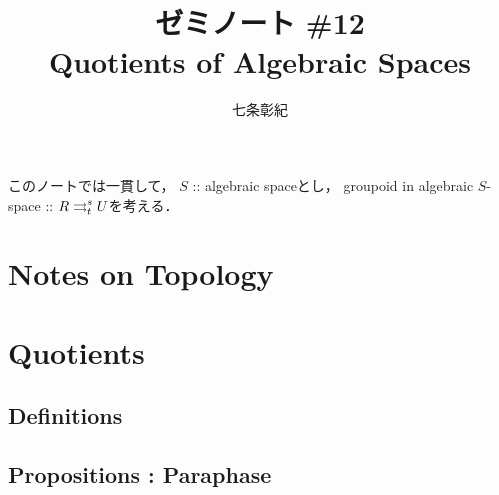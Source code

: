 \documentclass[a4paper, dvipdfmx]{jsarticle}
\begin{document}
\title{ゼミノート \#12 \\ Quotients of Algebraic Spaces}
\author{七条彰紀}
\maketitle
\tableofcontents
\vspace{10pt}

このノートでは一貫して，
$S$ :: algebraic spaceとし，
groupoid in algebraic $S$-space :: $R \mathrel{\mathop{\rightrightarrows}^{s}_{t}} U$を考える．

\section{Notes on Topology}

\section{Quotients}
\subsection{Definitions}

\subsection{Propositions : Paraphase}



\end{document}
